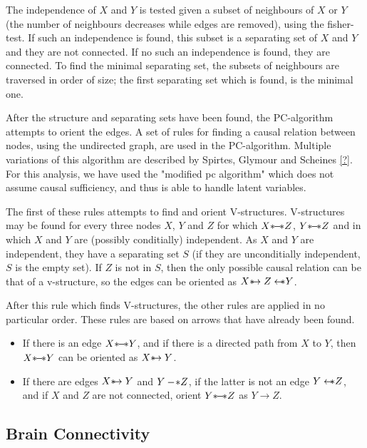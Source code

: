 \documentclass[a4paper, 10pt, english, twocolumn]{article}
\def \srightarrow {\text{\textasteriskcentered}\hspace{-0.62em}\rightarrow}
\def \sleftarrow {\leftarrow\hspace{-0.62em}\text{\textasteriskcentered}}
\def \sleftline {-\hspace{-0.16em}\text{\textasteriskcentered}}
\def \sline {\text{\textasteriskcentered}\hspace{-0.38em}-\hspace{-0.4em}\text{\textasteriskcentered}}
\begin{document}
The independence of $X$ and $Y$ is tested given a subset of neighbours of $X$ or $Y$ (the number of neighbours decreases while edges are removed), using the fisher-test.
If such an independence is found, this subset is a separating set of $X$ and $Y$ and they are not connected.
If no such an independence is found, they are connected.
To find the minimal separating set, the subsets of neighbours are traversed in order of size; the first separating set which is found, is the minimal one.

After the structure and separating sets have been found, the PC-algorithm attempts to orient the edges.
A set of rules for finding a causal relation between nodes, using the undirected graph, are used in the PC-algorithm. Multiple variations of this algorithm are described by Spirtes, Glymour and Scheines \ref{?}. For this analysis, we have used the "modified pc algorithm" which does not assume causal sufficiency, and thus is able to handle latent variables.

The first of these rules attempts to find and orient V-structures.
V-structures may be found for every three nodes $X$, $Y$ and $Z$ for which $X \sline Z$, $Y \sline Z$ and in which $X$ and $Y$ are (possibly conditially) independent.
As $X$ and $Y$ are independent, they have a separating set $S$ (if they are unconditially independent, $S$ is the empty set).
If $Z$ is not in $S$, then the only possible causal relation can be that of a v-structure, so the edges can be oriented as $X \srightarrow Z \sleftarrow Y$.


After this rule which finds V-structures, the other rules are applied in no particular order. These rules are based on arrows that have already been found.
\begin{itemize}
\item If there is an edge $X \sline Y$, and if there is a directed path from $X$ to $Y$, then $X \sline Y$ can be oriented as $X \srightarrow Y$.
\item If there are edges $X \srightarrow Y$ and $Y \sleftline Z$, if the latter is not an edge $Y \sleftarrow Z$, and if $X$ and $Z$ are not connected, orient $Y \sline Z$ as $Y \rightarrow Z$. 
\end{itemize}



\subsection{Brain Connectivity}

\end{document}
